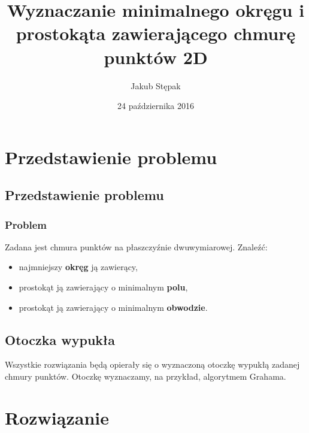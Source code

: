 \documentclass{beamer}
\title
[Minimalny okręg i prostokąt na chmurze punktów]
{Wyznaczanie minimalnego okręgu i prostokąta zawierającego chmurę punktów 2D}
\author
[Jakub Stępak]
{Jakub Stępak}
\institute
[AGH]
{
Akademia Górniczo – Hutnicza w Krakowie
}
\date{24 października 2016}
\begin{document}
\frame{\titlepage}


\section{Przedstawienie problemu}

\subsection{Przedstawienie problemu}

\begin{frame}

\frametitle{Problem}
Zadana jest chmura punktów na płaszczyźnie dwuwymiarowej.
\linebreak
\linebreak
Znaleźć:
\begin{itemize}[-]
\item najmniejszy \textbf{okręg} ją zawierący,
\item prostokąt ją zawierający o minimalnym \textbf{polu},
\item prostokąt ją zawierający o minimalnym \textbf{obwodzie}.
\end{itemize}

\end{frame}


\subsection{Otoczka wypukła}

\begin{frame}

Wszystkie rozwiązania będą opierały się o wyznaczoną otoczkę wypukłą zadanej chmury punktów. 
\linebreak 
\linebreak
Otoczkę wyznaczamy, na przykład, algorytmem Grahama.

\end{frame}


\section{Rozwiązanie}
\end{document}
